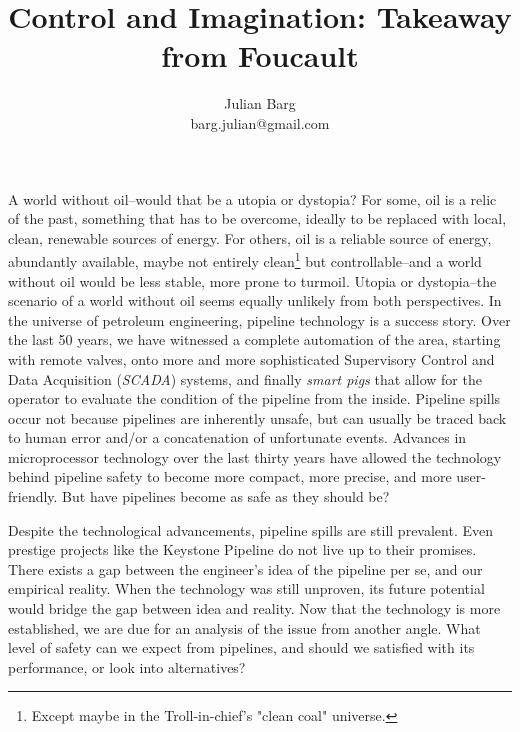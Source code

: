 \documentclass[12pt, man, natbib]{apa6}
\title{Control and Imagination: Takeaway from Foucault}
\author{Julian Barg\\barg.julian@gmail.com}
\affiliation{Ivey Business School}
\begin{document}
	
	\maketitle
	
	\singlespacing
	
	\section{}
	A world without oil--would that be a utopia or dystopia? For some, oil is a relic of the past, something that has to be overcome, ideally to be replaced with local, clean, renewable sources of energy. For others, oil is a reliable source of energy, abundantly available, maybe not entirely clean\footnote{Except maybe in the Troll-in-chief's "clean coal" universe.} but controllable--and a world without oil would be less stable, more prone to turmoil. Utopia or dystopia--the scenario of a world without oil seems equally unlikely from both perspectives. In the universe of petroleum engineering, pipeline technology is a success story. Over the last 50 years, we have witnessed a complete automation of the area, starting with remote valves, onto more and more sophisticated Supervisory Control and Data Acquisition (\textit{SCADA}) systems, and finally \textit{smart pigs} that allow for the operator to evaluate the condition of the pipeline from the inside. Pipeline spills occur not because pipelines are inherently unsafe, but can usually be traced back to human error and/or a concatenation of unfortunate events. Advances in microprocessor technology over the last thirty years have allowed the technology behind pipeline safety to become more compact, more precise, and more user-friendly. But have pipelines become as safe as they should be?
	
	Despite the technological advancements, pipeline spills are still prevalent. Even prestige projects like the Keystone Pipeline do not live up to their promises. There exists a gap between the engineer's idea of the pipeline per se, and our empirical reality. When the technology was still unproven, its future potential would bridge the gap between idea and reality. Now that the technology is more established, we are due for an analysis of the issue from another angle. What level of safety can we expect from pipelines, and should we satisfied with its performance, or look into alternatives?
	
\end{document}
